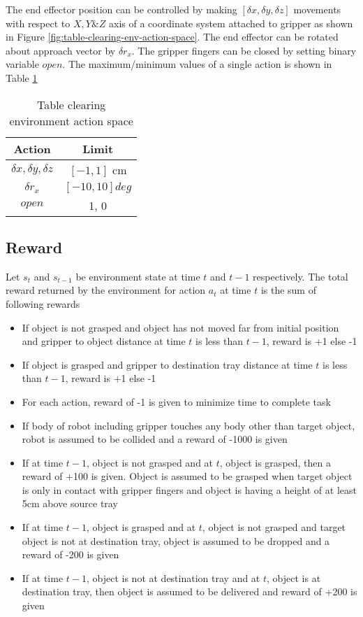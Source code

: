 The end effector position can be controlled by making $[\delta x, \delta y, \delta z]$ movements with respect to $X, Y \& Z$  axis of a coordinate system attached to gripper as shown in Figure \ref{fig:table-clearing-env-action-space}. The end effector can be rotated about approach vector by $\delta r_x$. The gripper fingers can be closed by setting binary variable $open$. The maximum/minimum values of a single action is shown in Table \ref{table:table-clearing-env-action-space}

\begin{table}[H]
	\centering
	\begin{tabular}{|c|c|}
		\hline 
		Action & Limit \\ 
		\hline 
		$\delta x, \delta y, \delta z$ & $[-1, 1]$ cm \\ 
		$\delta r_x$ & $[-10, 10] deg$ \\
		$open$ & {1, 0} \\
		\hline 
	\end{tabular}
	\caption{Table clearing environment action space}
	\label{table:table-clearing-env-action-space}
\end{table}

\subsection{Reward}
Let $s_t$ and $s_{t-1}$ be environment state at time $t$ and $t-1$ respectively. The total reward returned by the environment for action $a_t$ at time $t$ is the sum of following rewards

\begin{itemize}
	\item If object is not grasped and object has not moved far from initial position and gripper to object distance at time $t$ is less than $t-1$, reward is +1 else -1
	\item If object is grasped and gripper to destination tray distance at time $t$ is less than $t-1$, reward is +1 else -1
	\item For each action, reward of -1 is given to minimize time to complete task
	\item If body of robot including gripper touches any body other than target object, robot is assumed to be collided and a reward of -1000 is given
	\item If at time $t-1$, object is not grasped and at $t$, object is grasped, then a reward of +100 is given. Object is assumed to be grasped when target object is only in contact with gripper fingers and object is having a height of at least 5cm above source tray
	\item If at time $t-1$, object is grasped and at $t$, object is not grasped and target object is not at destination tray, object is assumed to be dropped and a reward of -200 is given
	\item If at time $t-1$, object is not at destination tray and at $t$, object is at destination tray, then object is assumed to be delivered and reward of +200 is given
\end{itemize}

